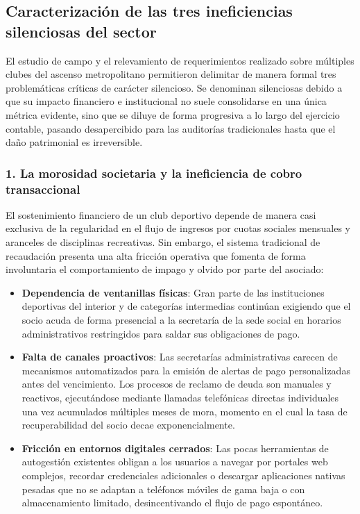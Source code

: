 \subsection{Caracterización de las tres ineficiencias silenciosas del sector}

El estudio de campo y el relevamiento de requerimientos realizado sobre múltiples clubes del ascenso metropolitano permitieron delimitar de manera formal tres problemáticas críticas de carácter silencioso. Se denominan silenciosas debido a que su impacto financiero e institucional no suele consolidarse en una única métrica evidente, sino que se diluye de forma progresiva a lo largo del ejercicio contable, pasando desapercibido para las auditorías tradicionales hasta que el daño patrimonial es irreversible.

\subsubsection{1. La morosidad societaria y la ineficiencia de cobro transaccional}
El sostenimiento financiero de un club deportivo depende de manera casi exclusiva de la regularidad en el flujo de ingresos por cuotas sociales mensuales y aranceles de disciplinas recreativas. Sin embargo, el sistema tradicional de recaudación presenta una alta fricción operativa que fomenta de forma involuntaria el comportamiento de impago y olvido por parte del asociado:
\begin{itemize}
    \item \textbf{Dependencia de ventanillas físicas}: Gran parte de las instituciones deportivas del interior y de categorías intermedias continúan exigiendo que el socio acuda de forma presencial a la secretaría de la sede social en horarios administrativos restringidos para saldar sus obligaciones de pago.
    \item \textbf{Falta de canales proactivos}: Las secretarías administrativas carecen de mecanismos automatizados para la emisión de alertas de pago personalizadas antes del vencimiento. Los procesos de reclamo de deuda son manuales y reactivos, ejecutándose mediante llamadas telefónicas directas individuales una vez acumulados múltiples meses de mora, momento en el cual la tasa de recuperabilidad del socio decae exponencialmente.
    \item \textbf{Fricción en entornos digitales cerrados}: Las pocas herramientas de autogestión existentes obligan a los usuarios a navegar por portales web complejos, recordar credenciales adicionales o descargar aplicaciones nativas pesadas que no se adaptan a teléfonos móviles de gama baja o con almacenamiento limitado, desincentivando el flujo de pago espontáneo.
\end{itemize}

